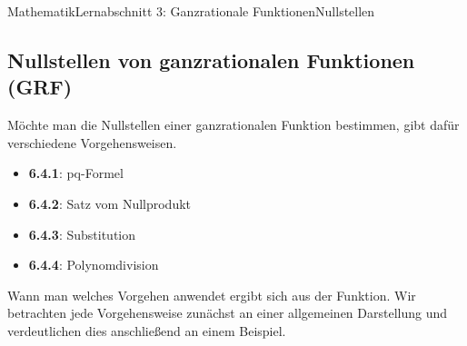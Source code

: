 \documentclass[11pt,twocolumn,oneside,openany,headings=optiontotoc,11pt,numbers=noenddot]{article}
\begin{document}
\begin{worksheet}{Mathematik}{Lernabschnitt 3: Ganzrationale Funktionen}{Nullstellen}
		\subsection{Nullstellen von ganzrationalen Funktionen (GRF)}
		Möchte man die Nullstellen einer ganzrationalen Funktion bestimmen, gibt dafür verschiedene Vorgehensweisen.
		\begin{itemize}
			\item[] \textbf{6.4.1}: pq-Formel
			\item[] \textbf{6.4.2}: Satz vom Nullprodukt
			\item[] \textbf{6.4.3}: Substitution
			\item[] \textbf{6.4.4}: Polynomdivision
		\end{itemize}
		Wann man welches Vorgehen anwendet ergibt sich aus der Funktion. Wir betrachten jede Vorgehensweise zunächst an einer allgemeinen Darstellung und verdeutlichen dies anschließend an einem Beispiel.

\end{worksheet}
\end{document}
